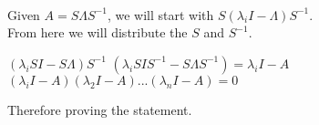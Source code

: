 \\
Given $A=S\Lambda S^{-1}$, we will start with $S(\lambda_i I-\Lambda)S^{-1}$.  \\
From here we will distribute the $S$ and $S^{-1}$.
\\
		\begin{center}
		    $(\lambda_i SI-S\Lambda)S^{-1}$
		    \newline
		    $(\lambda_i SIS^{-1}-S\Lambda S^{-1})=\lambda_i I-A$
		    \newline
		    $(\lambda_i I-A)(\lambda_2I-A)...(\lambda_n I-A)=0$
		    \newline
		\end{center}
		Therefore proving the statement.
